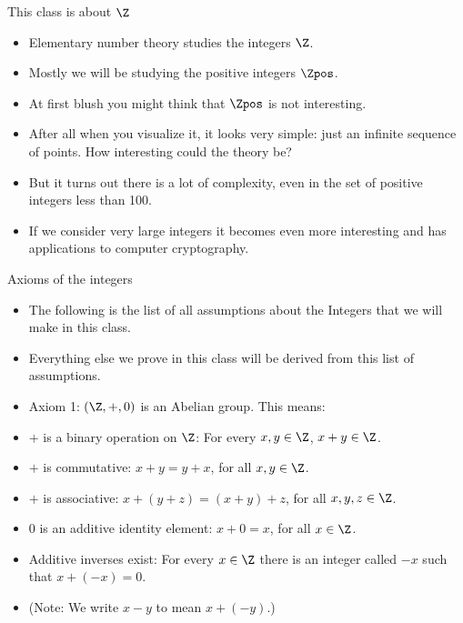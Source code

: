 \documentclass{beamer}
\begin{document}
\begin{frame}{This class is about $\Z$}

\begin{itemize}
\item Elementary number theory studies the integers $\Z$.
\item Mostly we will be studying the positive integers $\Zpos$.
\item At first blush you might think that $\Zpos$ is not interesting.
\item After all when you visualize it, it looks very simple: just an infinite sequence of points.
How interesting could the theory be?
\item But it turns out there is a lot of complexity, even in the set of positive integers less than 100.
\item If we consider very large integers it becomes even more interesting and has applications
to computer cryptography.
\end{itemize}
\end{frame}

\begin{frame}{Axioms of the integers}

\begin{itemize}
  \item The following is the list of all assumptions about the Integers that we
  will make in this class.
  \item Everything else we prove in this class will be derived from this list of assumptions.
  \item Axiom 1: $\left(\Z, +, 0\right)$ is an Abelian group. This means:
  \item  $+$ is a binary operation on $\Z$: For every $x,y\in\Z$, $x+y\in\Z$.
  \item  $+$ is commutative: $x+y=y+x$, for all $x,y\in\Z$.
  \item  $+$ is associative: $x + (y+z) = (x+y) +z$, for all $x,y,z\in\Z$.
  \item  $0$ is an additive identity element: $x+0 = x$, for all $x\in\Z$.
  \item  Additive inverses exist: For every $x\in\Z$ there is an integer called $-x$ such that $x+(-x) = 0$.
  \item  (Note: We write $x-y$ to mean $x+(-y)$.)
\end{itemize}

\end{frame}
\end{document}
